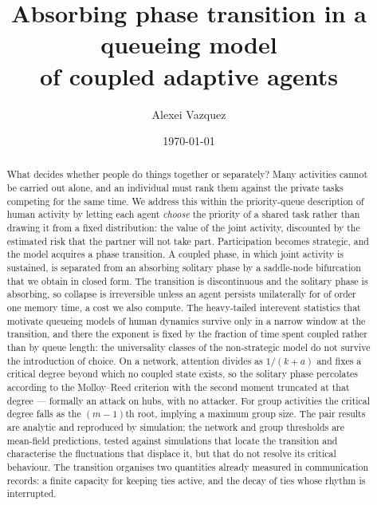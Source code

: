 \documentclass[aps,pre,twocolumn,superscriptaddress,floatfix,longbibliography]{revtex4-2}
\begin{document}
\title{Absorbing phase transition in a queueing model\\
of coupled adaptive agents}

\author{Alexei Vazquez}

\date{\today}

\begin{abstract}
What decides whether people do things together or separately? Many activities
cannot be carried out alone, and an individual must rank them against the
private tasks competing for the same time. We address this within the
priority-queue description of human activity by letting each agent \emph{choose}
the priority of a shared task rather than drawing it from a fixed distribution:
the value of the joint activity, discounted by the estimated risk that the
partner will not take part. Participation becomes strategic, and the model
acquires a phase transition. A coupled phase, in which joint activity is
sustained, is separated from an absorbing solitary phase by a saddle-node
bifurcation that we obtain in closed form. The transition is discontinuous and
the solitary phase is absorbing, so collapse is irreversible unless an agent
persists unilaterally for of order one memory time, a cost we also compute. The
heavy-tailed interevent statistics that motivate queueing models of human
dynamics survive only in a narrow window at the transition, and there the
exponent is fixed by the fraction of time spent coupled rather than by queue
length: the universality classes of the non-strategic model do not survive the
introduction of choice. On a network, attention divides as $1/(k+a)$ and fixes a
critical degree beyond which no coupled state exists, so the solitary phase
percolates according to the Molloy--Reed criterion with the second moment
truncated at that degree --- formally an attack on hubs, with no attacker. For
group activities the critical degree falls as the $(m-1)$th root, implying a
maximum group size. The pair results are analytic and reproduced by
simulation; the network and group thresholds are mean-field predictions, tested
against simulations that locate the transition and characterise the fluctuations
that displace it, but that do not resolve its critical behaviour. The transition
organises two quantities already measured in
communication records: a finite capacity for keeping ties active, and the decay
of ties whose rhythm is interrupted.
\end{abstract}
\end{document}
